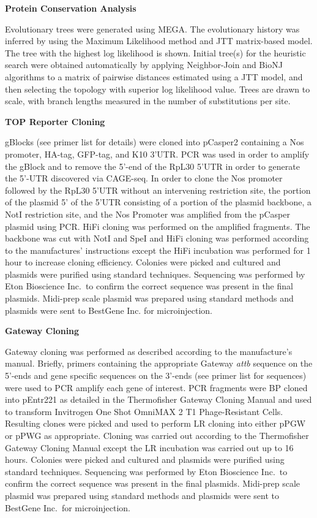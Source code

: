 \documentclass[12pt,oneside]{reedthesis}
\begin{document}
\textbf{Protein Conservation Analysis}

Evolutionary trees were generated using MEGA. The evolutionary history
was inferred by using the Maximum Likelihood method and JTT matrix-based
model. The tree with the highest log likelihood is shown. Initial
tree(s) for the heuristic search were obtained automatically by applying
Neighbor-Join and BioNJ algorithms to a matrix of pairwise distances
estimated using a JTT model, and then selecting the topology with
superior log likelihood value. Trees are drawn to scale, with branch
lengths measured in the number of substitutions per site.

\textbf{TOP Reporter Cloning}

gBlocks (see primer list for details) were cloned into pCasper2
containing a Nos promoter, HA-tag, GFP-tag, and K10 3'UTR. PCR was used
in order to amplify the gBlock and to remove the 5'-end of the RpL30
5'UTR in order to generate the 5'-UTR discovered via CAGE-seq. In order
to clone the Nos promoter followed by the RpL30 5'UTR without an
intervening restriction site, the portion of the plasmid 5' of the 5'UTR
consisting of a portion of the plasmid backbone, a NotI restriction
site, and the Nos Promoter was amplified from the pCasper plasmid using
PCR. HiFi cloning was performed on the amplified fragments. The backbone
was cut with NotI and SpeI and HiFi cloning was performed according to
the manufactures' instructions except the HiFi incubation was performed
for 1 hour to increase cloning efficiency. Colonies were picked and
cultured and plasmids were purified using standard techniques.
Sequencing was performed by Eton Bioscience Inc.~to confirm the correct
sequence was present in the final plasmids. Midi-prep scale plasmid was
prepared using standard methods and plasmids were sent to BestGene Inc.
for microinjection.

\textbf{Gateway Cloning}

Gateway cloning was performed as described according to the
manufacture's manual. Briefly, primers containing the appropriate
Gateway \emph{attb} sequence on the 5'-ends and gene specific sequences on
the 3'-ends (see primer list for sequences) were used to PCR amplify
each gene of interest. PCR fragments were BP cloned into pEntr221 as
detailed in the Thermofisher Gateway Cloning Manual and used to
transform Invitrogen One Shot OmniMAX 2 T1 Phage-Resistant Cells.
Resulting clones were picked and used to perform LR cloning into either
pPGW or pPWG as appropriate. Cloning was carried out according to the
Thermofisher Gateway Cloning Manual except the LR incubation was carried
out up to 16 hours. Colonies were picked and cultured and plasmids were
purified using standard techniques. Sequencing was performed by Eton
Bioscience Inc.~to confirm the correct sequence was present in the final
plasmids. Midi-prep scale plasmid was prepared using standard methods
and plasmids were sent to BestGene Inc.~for microinjection.
\end{document}
